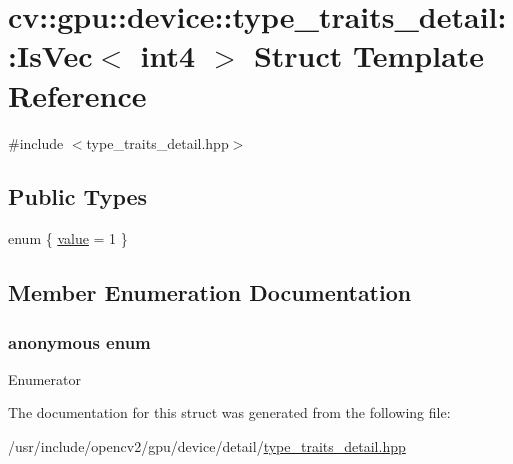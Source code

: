 \hypertarget{structcv_1_1gpu_1_1device_1_1type__traits__detail_1_1IsVec_3_01int4_01_4}{\section{cv\-:\-:gpu\-:\-:device\-:\-:type\-\_\-traits\-\_\-detail\-:\-:Is\-Vec$<$ int4 $>$ Struct Template Reference}
\label{structcv_1_1gpu_1_1device_1_1type__traits__detail_1_1IsVec_3_01int4_01_4}
}


{\ttfamily \#include $<$type\-\_\-traits\-\_\-detail.\-hpp$>$}

\subsection*{Public Types}
\begin{DoxyCompactItemize}
\item 
enum \{ \hyperlink{structcv_1_1gpu_1_1device_1_1type__traits__detail_1_1IsVec_3_01int4_01_4_a022f2fa6e1d9d2ad121b17c998d1ee40a52e01a1d41cb741877e8b6dcd632d089}{value} = 1
 \}
\end{DoxyCompactItemize}


\subsection{Member Enumeration Documentation}
\hypertarget{structcv_1_1gpu_1_1device_1_1type__traits__detail_1_1IsVec_3_01int4_01_4_a022f2fa6e1d9d2ad121b17c998d1ee40}{\subsubsection[{anonymous enum}]{\setlength{\rightskip}{0pt plus 5cm}anonymous enum}}\label{structcv_1_1gpu_1_1device_1_1type__traits__detail_1_1IsVec_3_01int4_01_4_a022f2fa6e1d9d2ad121b17c998d1ee40}
\begin{Desc}
\item[Enumerator]\par
\begin{description}
\item[{\em 
\hypertarget{structcv_1_1gpu_1_1device_1_1type__traits__detail_1_1IsVec_3_01int4_01_4_a022f2fa6e1d9d2ad121b17c998d1ee40a52e01a1d41cb741877e8b6dcd632d089}{value}\label{structcv_1_1gpu_1_1device_1_1type__traits__detail_1_1IsVec_3_01int4_01_4_a022f2fa6e1d9d2ad121b17c998d1ee40a52e01a1d41cb741877e8b6dcd632d089}
}]\end{description}
\end{Desc}


The documentation for this struct was generated from the following file\-:\begin{DoxyCompactItemize}
\item 
/usr/include/opencv2/gpu/device/detail/\hyperlink{type__traits__detail_8hpp}{type\-\_\-traits\-\_\-detail.\-hpp}\end{DoxyCompactItemize}
